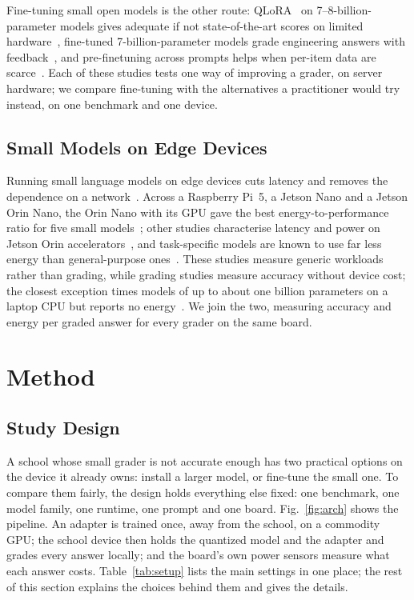 \documentclass[journal]{IEEEtran}
\begin{document}
Fine-tuning small open models is the other route: QLoRA~\cite{dettmers2023qlora} on 7--8-billion-parameter models gives adequate if not state-of-the-art scores on limited hardware~\cite{ormerod2024gpupoor}, fine-tuned 7-billion-parameter models grade engineering answers with feedback~\cite{aggarwal2024engsaf}, and pre-finetuning across prompts helps when per-item data are scarce~\cite{funayama2025crossprompt}.
Each of these studies tests one way of improving a grader, on server hardware; we compare fine-tuning with the alternatives a practitioner would try instead, on one benchmark and one device.

\subsection{Small Models on Edge Devices}
Running small language models on edge devices cuts latency and removes the dependence on a network~\cite{islam2025edgeenergy}.
Across a Raspberry Pi~5, a Jetson Nano and a Jetson Orin Nano, the Orin Nano with its GPU gave the best energy-to-performance ratio for five small models~\cite{islam2025edgeenergy}; other studies characterise latency and power on Jetson Orin accelerators~\cite{arya2025edgepower}, and task-specific models are known to use far less energy than general-purpose ones~\cite{luccioni2024power}.
These studies measure generic workloads rather than grading, while grading studies measure accuracy without device cost; the closest exception times models of up to about one billion parameters on a laptop CPU but reports no energy~\cite{saur2026grading}.
We join the two, measuring accuracy and energy per graded answer for every grader on the same board.

\section{Method}
\label{sec:method}

\subsection{Study Design}
\label{sec:design}
A school whose small grader is not accurate enough has two practical options on the device it already owns: install a larger model, or fine-tune the small one. To compare them fairly, the design holds everything else fixed: one benchmark, one model family, one runtime, one prompt and one board.
Fig.~\ref{fig:arch} shows the pipeline.
An adapter is trained once, away from the school, on a commodity GPU; the school device then holds the quantized model and the adapter and grades every answer locally; and the board's own power sensors measure what each answer costs.
Table~\ref{tab:setup} lists the main settings in one place; the rest of this section explains the choices behind them and gives the details.
\end{document}

